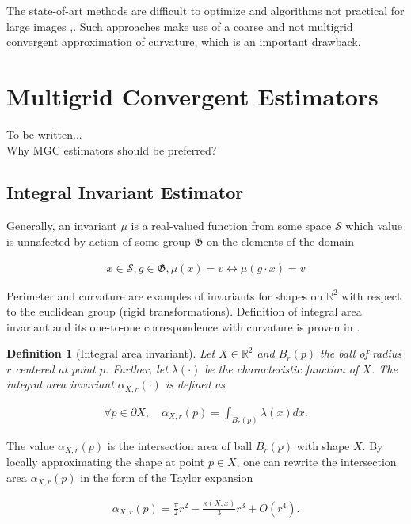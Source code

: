 \documentclass[runningheads]{llncs}
\newtheorem{ddef}{Definition}
\begin{document}
The state-of-art methods are difficult to optimize and algorithms  not practical for large images \cite{schoenemann09},\cite{nieuwenhuis14}. Such approaches make use of a coarse and not multigrid convergent approximation of curvature, which is an important drawback.


\section{Multigrid Convergent Estimators}
To be written...\\
Why MGC estimators should be preferred?

\subsection{Integral Invariant Estimator}
Generally, an invariant $\mu$ is a real-valued function from some space $\mathcal{S}$ which value is unnafected by action of some group $\mathfrak{G}$ on the elements of the domain
		
		\begin{align*}
			x \in \mathcal{S}, g \in \mathfrak{G}, \mu(x) = v \longleftrightarrow \mu(g \cdot x ) = v
		\end{align*}
		
		Perimeter and curvature are examples of invariants for shapes on $\mathbb{R}^2$ with respect to the euclidean group (rigid transformations). Definition of integral area invariant and its one-to-one correspondence with curvature is proven in \cite{manay04}.


\begin{ddef}[Integral area invariant]
	Let $X \in \mathbb{R}^2$ and $B_r(p)$ the ball of radius $r$ centered at point $p$. Further, let $\lambda(\cdot)$ be the characteristic function of $X$. The integral area invariant $\alpha_{X,r}(\cdot)$ is defined as
	
	\begin{align*}
		\forall p \in \partial X, \quad \alpha_{X,r}(p) = \int_{B_r(p)}{ \lambda(x) dx}.
	\end{align*}
\end{ddef}


	The value $\alpha_{X,r}(p)$ is the intersection area of ball $B_r(p)$ with shape $X$. By locally approximating the shape at point $p \in X$, one can rewrite the intersection area $\alpha_{X,r}(p)$ in the form of the Taylor expansion \cite{pottman09}
	
		\begin{align*}
			\alpha_{X,r}(p) = \frac{\pi}{2}r^2 - \frac{\kappa(X,x)}{3}r^3 + O(r^4).
		\end{align*}
		
\end{document}
